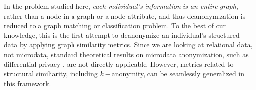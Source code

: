 In the problem studied here, \emph{each individual's information is an entire graph}, rather than a node in a graph or a node attribute, and thus deanonymization is reduced to a graph matching or classification problem.
To the best of our knowledge, this is the first attempt to deanonymize an individual's structured data by applying graph similarity metrics.
Since we are looking at relational data, not microdata, standard theoretical results on microdata anonymization, such as differential privacy \cite{dwork2006calibrating}, are not directly applicable.
However, metrics related to structural similiarity, including $k-$anonymity, can be seamlessly generalized in this framework.
